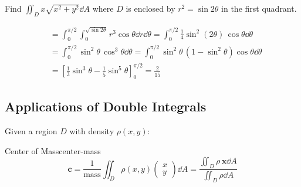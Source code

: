 \begin{example}
  Find $\displaystyle\iint_D x\sqrt{x^2+y^2}\dd{A}$
  where $D$ is enclosed by $r^2=\sin 2\theta$ in the first quadrant.

  \begin{center}
  \end{center}

  \begin{align*}
     & = \int_0^{\pi/2}\!\int_0^{\sqrt{\sin 2\theta}}
    r^3\cos\theta\dd{r}\dd{\theta}
    = \int_0^{\pi/2}\tfrac{1}{4}\sin^2\!(2\theta)\,\cos\theta\dd{\theta}    \\
     & = \int_0^{\pi/2}\sin^2\!\theta\,\cos^3\!\theta\dd{\theta}
    = \int_0^{\pi/2}\sin^2\!\theta\,(1-\sin^2\!\theta)\cos\theta\dd{\theta} \\
     & = \left[\tfrac{1}{3}\sin^3\!\theta
      -\tfrac{1}{5}\sin^5\!\theta\right]_0^{\pi/2}
    = \frac{2}{15}
  \end{align*}
\end{example}

\subsection{Applications of Double Integrals}

Given a region $D$ with density $\rho(x,y)$:

\begin{definition}{Center of Mass}{center-mass}
  \[
    \mathbf{c}
    = \frac{1}{\text{mass}}
    \iint_D \rho(x,y)
    \begin{pmatrix}
      x \\y
    \end{pmatrix}
    \dd{A}
    = \frac{\iint_D \rho\,\mathbf{x}\dd{A}}
    {\iint_D \rho\dd{A}}
  \]
\end{definition}

